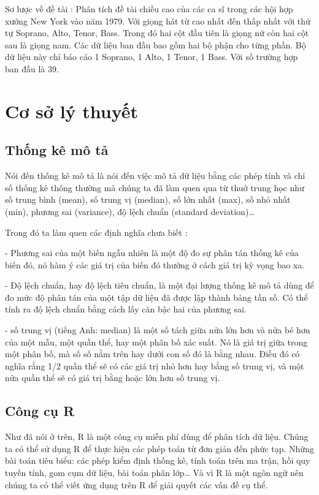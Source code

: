 \documentclass[a4paper]{article}
\begin{document}
Sơ lược về đề tài : Phân tích đề tài  chiều cao của các ca sĩ trong các hội hợp xướng New York vào năm 1979. Với giọng hát từ cao nhất đến thấp nhất với thứ tự Soprano, Alto, Tenor, Bass. Trong đó hai cột đầu tiên là giọng nữ còn hai cột sau là giọng nam. Các dữ liệu ban đầu bao gồm hai bộ phận cho từng phần. Bộ dữ liệu này chỉ báo cáo 1 Soprano, 1 Alto, 1 Tenor, 1 Bass. Với số trường hợp ban đầu là 39.

\section{Cơ sở lý thuyết}
	\subsection{Thống kê mô tả}
	Nói đến thống kê mô tả là nói đến việc mô tả dữ liệu bằng các phép tính và chỉ số thống kê thông thường mà chúng ta đã làm quen qua từ thuở trung học như số trung bình (mean), số trung vị (median), số lớn nhất (max), số nhỏ nhất (min), phương sai (variance), độ lệch chuẩn (standard deviation)…
	
	Trong đó ta làm quen các định nghĩa chưa biết :
	
		- Phương sai của một biến ngẫu nhiên là một độ đo sự phân tán thống kê của biến đó, nó hàm ý các giá trị của biến đó thường ở cách giá trị kỳ vọng bao xa. 
		
		- Độ lệch chuẩn, hay độ lệch tiêu chuẩn, là một đại lượng thống kê mô tả dùng để đo mức độ phân tán của một tập dữ liệu đã được lập thành bảng tần số. Có thể tính ra độ lệch chuẩn bằng cách lấy căn bậc hai của phương sai.
		
		- số trung vị (tiếng Anh: median) là một số tách giữa nửa lớn hơn và nửa bé hơn của một mẫu, một quần thể, hay một phân bố xác suất. Nó là giá trị giữa trong một phân bố, mà số số nằm trên hay dưới con số đó là bằng nhau. Điều đó có nghĩa rằng 1/2 quần thể sẽ có các giá trị nhỏ hơn hay bằng số trung vị, và một nửa quần thể sẽ có giá trị bằng hoặc lớn hơn số trung vị.
	
	\subsection{Công cụ R}
	Như đã nói ở trên, R là một công cụ miễn phí dùng để phân tích dữ liệu. Chúng ta có thể sử dụng R để thực hiện các phép toán từ đơn giản đến phức tạp. Những bài toán tiêu biểu: các phép kiểm định thống kê, tính toán trên ma trận, hồi quy tuyến tính, gom cụm dữ liệu, bài toán phân lớp… Và vì R là một ngôn ngữ nên chúng ta có thể viết ứng dụng trên R để giải quyết các vấn đề cụ thể.
	
\end{document}
